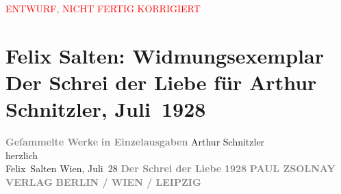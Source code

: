 
\begin{center}
            \textcolor{red}{ENTWURF, NICHT FERTIG KORRIGIERT}
                      \end{center}
            
         
         \renewcommand{\erwaehntePersonen}{Personen: Felix Salten}
         \renewcommand{\erwaehnteInstitutionen}{Institutionen: Paul Zsolnay Verlag}
         \renewcommand{\erwaehnteOrte}{Orte: Berlin, Leipzig, Wien}
         \renewcommand{\erwaehnteWerke}{Werke: Der Schrei der Liebe. Novellen}
               \section[Felix Salten: Widmungsexemplar Der Schrei der Liebe für Arthur Schnitzler, Juli 1928]{ Felix Salten: Widmungsexemplar Der Schrei der Liebe für Arthur
               Schnitzler, Juli 1928}\nopagebreak{}\rehead{ }\begin{ledgroupsized}[t]{13cm}\normalsize\beginnumbering \toendnotes[C]{\smallbreak\pagebreak[2]} 
\pstart
           \noindent{}\centering{}{\pb}\textcolor{gray}{\textbf{\textsc{}}}\pend
           \pstart
           \noindent{}\centering{}\textcolor{gray}{\textbf{Geſammelte Werke}}\pend
           \pstart
           \noindent{}\centering{}\textcolor{gray}{\textbf{in Einzelausgaben}}\pend
           \pstart
           \noindent{}Arthur Schnitzler {\\}herzlich {\\}\spacefill\mbox{Felix Salten}\pend
           \pstart
           Wien, Juli 28\pend
           {\bigskip}\pstart
           \noindent{}\centering{}{\pb}\textcolor{gray}{\textbf{\textsc{}}}\pend
           \pstart
           \noindent{}\centering{}\textcolor{gray}{\textbf{Der Schrei der Liebe}}\pend
           \pstart
           \noindent{}\centering{}\textcolor{gray}{\textbf{\textsc{}}}\pend
           {\bigskip}\pstart
           \noindent{}\centering{}\textcolor{gray}{\textbf{\textsc{1928}}}\pend
           \pstart
           \noindent{}\centering{}\textcolor{gray}{\textbf{\textsc{PAUL ZSOLNAY VERLAG}}}\pend
           \pstart
           \noindent{}\centering{}\textcolor{gray}{\textbf{\textsc{BERLIN / WIEN / LEIPZIG}}}\pend
           
         
         \endnumbering{}\end{ledgroupsized}  \newcommand{\dateiname}{L03044}\newcommand{\titel}{Felix Salten: Widmungsexemplar Der Schrei der Liebe für Arthur Schnitzler, Juli 1928}\newcommand{\editorInnen}{Martin Anton Müller und Laura Untner}
      